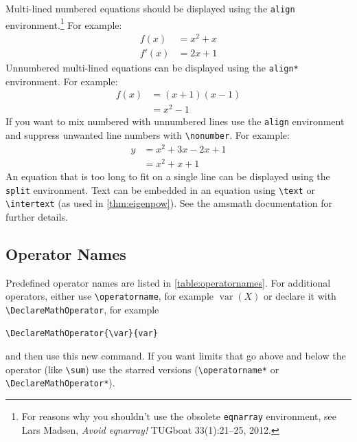 \documentclass{article}
\begin{document}
Multi-lined numbered equations should be displayed using the
\texttt{align} environment.\footnote{For reasons why you 
shouldn't use the obsolete \texttt{eqnarray} environment, see
Lars Madsen, \emph{Avoid eqnarray!} TUGboat 33(1):21--25, 2012.} For example:
\begin{align}
f(x) &= x^2 + x\label{eq:f}\\
f'(x) &= 2x + 1\label{eq:df}
\end{align}
Unnumbered multi-lined equations can be displayed using the
\texttt{align*} environment. For example:
\begin{align*}
f(x) &= (x+1)(x-1)\\
&= x^2 - 1
\end{align*}
If you want to mix numbered with unnumbered lines use the
\texttt{align} environment and suppress unwanted line numbers with
\verb|\nonumber|. For example:
\begin{align}
y &= x^2 + 3x - 2x + 1\nonumber\\
&= x^2 + x + 1\label{eq:y}
\end{align}
An equation that is too long to fit on a single line can be
displayed using the \texttt{split} environment. 
Text can be embedded in an equation using \verb|\text| or
\verb|\intertext| (as used in \ref{thm:eigenpow}).
See the \textsf{amsmath} documentation for further details.

\subsection{Operator Names}
\label{sec:op}

Predefined operator names are listed in \ref{table:operatornames}.
For additional operators, either use \verb|\operatorname|,
for example $\operatorname{var}(X)$ or declare it with
\verb|\DeclareMathOperator|, for example
\begin{verbatim}
\DeclareMathOperator{\var}{var}
\end{verbatim}
and then use this new command. If you want limits that go above and
below the operator (like \verb|\sum|) use the starred versions
(\verb|\operatorname*| or \verb|\DeclareMathOperator*|).
\end{document}
